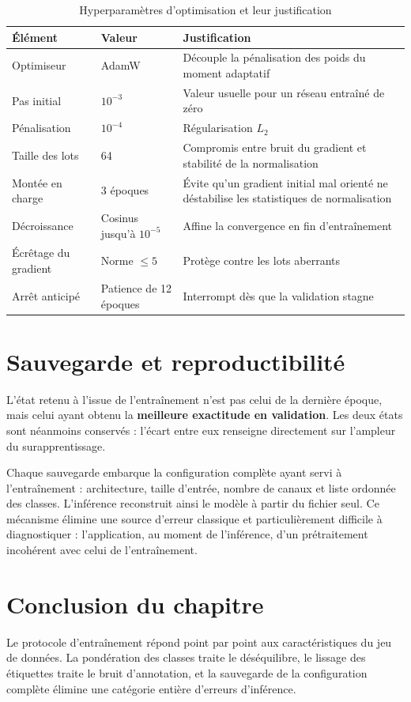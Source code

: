 \documentclass[a4paper,12pt]{report}
\begin{document}
\begin{table}[htbp]
\centering
\caption{Hyperparamètres d'optimisation et leur justification}
\begin{tabular}{|l|l|p{6cm}|}
\hline
\textbf{Élément} & \textbf{Valeur} & \textbf{Justification} \\
\hline
Optimiseur & AdamW & Découple la pénalisation des poids du moment adaptatif \\
Pas initial & $10^{-3}$ & Valeur usuelle pour un réseau entraîné de zéro \\
Pénalisation & $10^{-4}$ & Régularisation $L_2$ \\
Taille des lots & 64 & Compromis entre bruit du gradient et stabilité de la normalisation \\
Montée en charge & 3 époques & Évite qu'un gradient initial mal orienté ne déstabilise les statistiques de normalisation \\
Décroissance & Cosinus jusqu'à $10^{-5}$ & Affine la convergence en fin d'entraînement \\
Écrêtage du gradient & Norme $\leq 5$ & Protège contre les lots aberrants \\
Arrêt anticipé & Patience de 12 époques & Interrompt dès que la validation stagne \\
\hline
\end{tabular}
\end{table}

\section{Sauvegarde et reproductibilité}

L'état retenu à l'issue de l'entraînement n'est pas celui de la dernière époque,
mais celui ayant obtenu la \textbf{meilleure exactitude en validation}. Les deux
états sont néanmoins conservés : l'écart entre eux renseigne directement sur
l'ampleur du surapprentissage.

Chaque sauvegarde embarque la configuration complète ayant servi à
l'entraînement : architecture, taille d'entrée, nombre de canaux et liste
ordonnée des classes. L'inférence reconstruit ainsi le modèle à partir du
fichier seul. Ce mécanisme élimine une source d'erreur classique et
particulièrement difficile à diagnostiquer : l'application, au moment de
l'inférence, d'un prétraitement incohérent avec celui de l'entraînement.

\section*{Conclusion du chapitre}
Le protocole d'entraînement répond point par point aux caractéristiques du jeu
de données. La pondération des classes traite le déséquilibre, le lissage des
étiquettes traite le bruit d'annotation, et la sauvegarde de la configuration
complète élimine une catégorie entière d'erreurs d'inférence.
\end{document}
